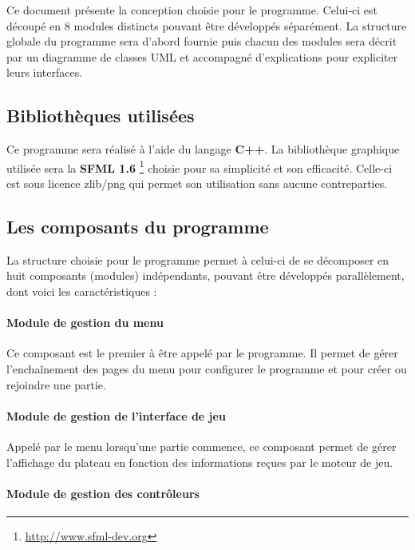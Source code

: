Ce document présente la conception choisie pour le programme. Celui-ci est découpé en 8 modules distincts pouvant être développés séparément.  La structure globale du programme sera d'abord fournie puis chacun des modules sera décrit par un diagramme de classes UML et accompagné d'explications pour expliciter leurs interfaces.

\vspace{0.5cm}

\subsection{Bibliothèques utilisées}

Ce programme sera réalisé à l'aide du langage \textbf{C++}. La bibliothèque graphique utilisée sera la \textbf{SFML 1.6} \footnote{\url{http://www.sfml-dev.org}} choisie pour sa simplicité et son efficacité. Celle-ci est sous licence zlib/png qui permet son utilisation sans aucune contreparties.

\subsection{Les composants du programme}

La structure choisie pour le programme permet à celui-ci de se décomposer en huit composants (modules) indépendants, pouvant être développés parallèlement, dont voici les caractéristiques :

\paragraph{Module de gestion du menu}

Ce composant est le premier à être appelé par le programme. Il permet de gérer l'enchaînement des pages du menu pour configurer le programme et pour créer ou rejoindre une partie.

\paragraph{Module de gestion de l'interface de jeu}

Appelé par le menu lorsqu'une partie commence, ce composant permet de gérer l'affichage du plateau en fonction des informations reçues par le moteur de jeu.

\paragraph{Module de gestion des contrôleurs}

